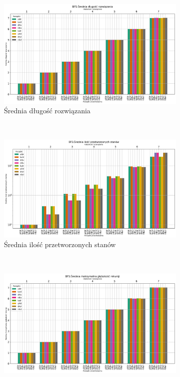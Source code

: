 \documentclass{classrep}
\begin{document}
\begin{figure}[H]
    \centering
    \begin{subfigure}[t]{0.8\textwidth}
        \includegraphics[width=\textwidth]{charts/BFS_path_length.png}
        \caption{Średnia długość rozwiązania}
        \label{BFS:path_length}
    \end{subfigure}
    ~ %
    \begin{subfigure}[t]{0.8\textwidth}
        \includegraphics[width=\textwidth]{charts/BFS_processed.png}
        \caption{Średnia ilość przetworzonych stanów}
        \label{BFS:processed}
    \end{subfigure}
    \qquad
    ~ %
    \begin{subfigure}[t]{\textwidth}
        \includegraphics[width=\textwidth]{charts/BFS_recursed.png}

\end{subfigure}
\end{figure}
\end{document}
